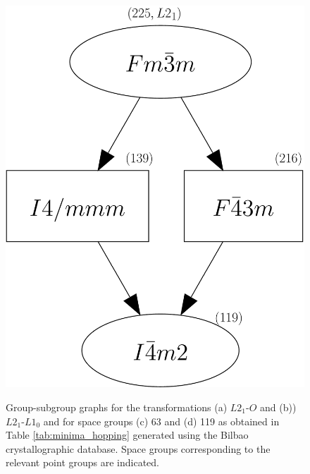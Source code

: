 \documentclass[%
preprint,
 amsmath,amssymb,
 aps,
prb,
showkeys,
]{revtex4-1}
\begin{document}
\begin{figure}[htp!]
{  \includegraphics[scale=0.25]{figure_4d}}
\caption{Group-subgroup graphs for the transformations (a) $L2_1$-$O$ and (b)) $L2_1$-$L1_0$  and for space groups (c) 63 and (d) 119  as obtained in Table \ref{tab:minima_hopping} generated using the Bilbao crystallographic database. Space groups corresponding to the relevant point groups are indicated.}
\label{subgroups}
\end{figure}
\end{document}
